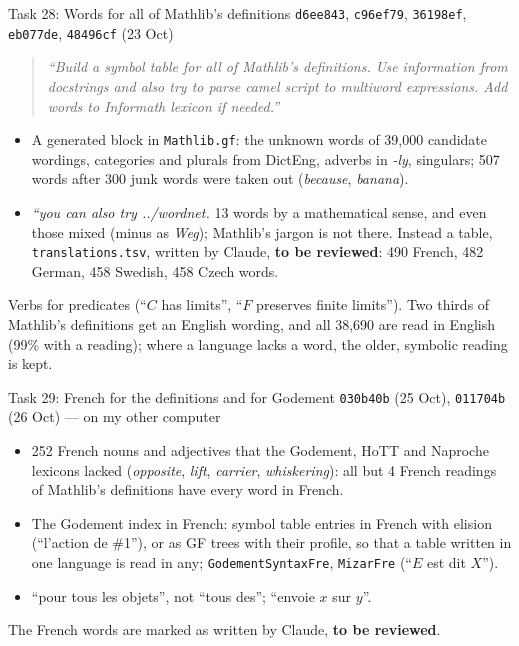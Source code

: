 \documentclass[10pt,aspectratio=169]{beamer}
\newcommand{\bad}[1]{\textcolor{warn}{#1}}
\newcommand{\ok}[1]{\textcolor{good}{#1}}
\newcommand{\commit}[1]{\texttt{\footnotesize #1}}
\newcommand{\prompt}[1]{\begin{quote}\small\itshape ``#1''\end{quote}}
\begin{document}
\begin{frame}{Task 28: Words for all of Mathlib's definitions}
  \commit{d6ee843}, \commit{c96ef79}, \commit{36198ef}, \commit{eb077de}, \commit{48496cf} (23 Oct)
  \prompt{Build a symbol table for all of Mathlib's definitions. Use information from
  docstrings and also try to parse camel script to multiword expressions. Add words to
  Informath lexicon if needed.}
  \begin{itemize}\small
    \item A generated block in \texttt{Mathlib.gf}: the unknown words of 39,000 candidate
          wordings, categories and plurals from DictEng, adverbs in \emph{-ly}, singulars;
          507 words after 300 junk words were taken out (\emph{because}, \emph{banana}).
    \item \textit{``you can also try ../wordnet.} 13 words by a mathematical sense, and even
          those mixed (minus as \bad{\emph{Weg}}); Mathlib's jargon is not there.
          Instead a table, \texttt{translations.tsv}, written by Claude, \textbf{to be
          reviewed}: 490 French, 482 German, 458 Swedish, 458 Czech words.
  \end{itemize}
  Verbs for predicates (``$C$ has limits'', ``$F$ preserves finite limits''). Two thirds of
  Mathlib's definitions get an English wording, and all 38,690 are read in English (99\% with a
  reading); where a language lacks a word, the older, symbolic reading is kept.
\end{frame}


\begin{frame}{Task 29: French for the definitions and for Godement}
  \commit{030b40b} (25 Oct), \commit{011704b} (26 Oct) --- on my other computer
  \begin{itemize}\small
    \item 252 French nouns and adjectives that the Godement, HoTT and Naproche lexicons
          lacked (\emph{opposite}, \emph{lift}, \emph{carrier}, \emph{whiskering}):
          all but 4 French readings of Mathlib's definitions have every word in French.
    \item The Godement index in French: symbol table entries in French with elision
          (``l'action de \#1''), or as GF trees with their profile, so that a table
          written in one language is read in any; \texttt{GodementSyntaxFre},
          \texttt{MizarFre} (``$E$ est dit $X$'').
    \item ``pour \ok{tous les} objets'', not \bad{``tous des''}; ``envoie $x$ \ok{sur} $y$''.
  \end{itemize}
  The French words are marked as written by Claude, \textbf{to be reviewed}.
\end{frame}
\end{document}

